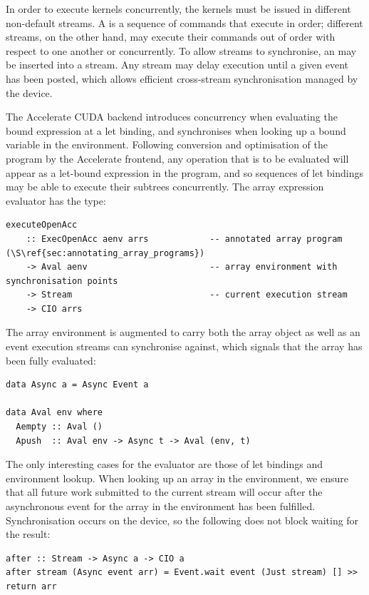 In order to execute kernels concurrently, the kernels must be issued in
different non-default streams. A  is a sequence of commands that
execute in order; different streams, on the other hand, may execute their
commands out of order with respect to one another or concurrently. To allow
streams to synchronise, an  may be inserted into a stream. Any
stream may delay execution until a given event has been posted, which allows
efficient cross-stream synchronisation managed by the device.

The Accelerate CUDA backend introduces concurrency when evaluating the bound
expression at a let binding, and synchronises when looking up a bound variable
in the environment. Following conversion and optimisation of the program by the
Accelerate frontend, any operation that is to be evaluated will appear as a
let-bound expression in the program, and so sequences of let bindings may be
able to execute their subtrees concurrently. The array expression evaluator has
the type:
%
\begin{lstlisting}[style=haskell]
executeOpenAcc
    :: ExecOpenAcc aenv arrs            -- annotated array program (\S\ref{sec:annotating_array_programs})
    -> Aval aenv                        -- array environment with synchronisation points
    -> Stream                           -- current execution stream
    -> CIO arrs
\end{lstlisting}
%
The array environment is augmented to carry both the array object as well as an
event execution streams can synchronise against, which signals that the array
has been fully evaluated:
%
\begin{lstlisting}[style=haskell]
data Async a = Async Event a

data Aval env where
  Aempty :: Aval ()
  Apush  :: Aval env -> Async t -> Aval (env, t)
\end{lstlisting}

The only interesting cases for the evaluator are those of let bindings and
environment lookup. When looking up an array in the environment, we ensure that
all future work submitted to the current stream will occur after the
asynchronous event for the array in the environment has been fulfilled.
Synchronisation occurs on the device, so the following does not block waiting
for the result:
%
\begin{lstlisting}[style=haskell]
after :: Stream -> Async a -> CIO a
after stream (Async event arr) = Event.wait event (Just stream) [] >> return arr
\end{lstlisting}

